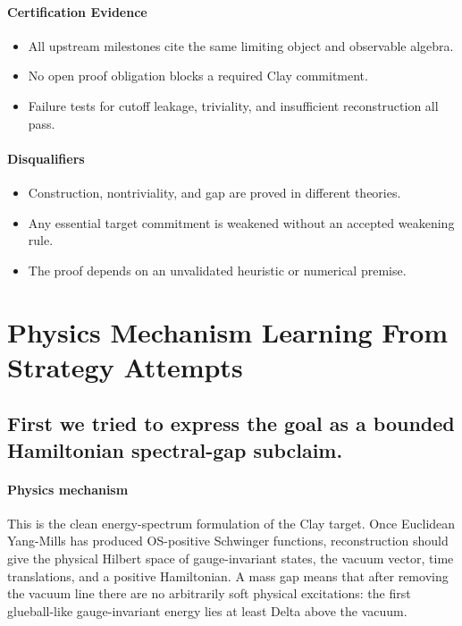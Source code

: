 \documentclass[11pt]{article}
\begin{document}
\paragraph{Certification Evidence}

\begin{itemize}
\item All upstream milestones cite the same limiting object and observable algebra.
\item No open proof obligation blocks a required Clay commitment.
\item Failure tests for cutoff leakage, triviality, and insufficient reconstruction all pass.
\end{itemize}

\paragraph{Disqualifiers}

\begin{itemize}
\item Construction, nontriviality, and gap are proved in different theories.
\item Any essential target commitment is weakened without an accepted weakening rule.
\item The proof depends on an unvalidated heuristic or numerical premise.
\end{itemize}

\section*{Physics Mechanism Learning From Strategy Attempts}

\subsection*{First we tried to express the goal as a bounded Hamiltonian spectral-gap subclaim.}

\paragraph{Physics mechanism}

This is the clean energy-spectrum formulation of the Clay target. Once Euclidean Yang-Mills has produced OS-positive Schwinger functions, reconstruction should give the physical Hilbert space of gauge-invariant states, the vacuum vector, time translations, and a positive Hamiltonian. A mass gap means that after removing the vacuum line there are no arbitrarily soft physical excitations: the first glueball-like gauge-invariant energy lies at least Delta above the vacuum.
\end{document}
